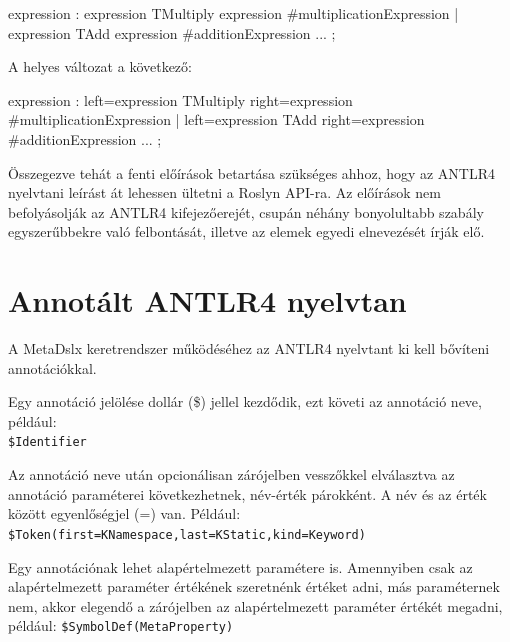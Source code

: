 \documentclass[12pt, a4paper]{report}
\newcommand{\f}[1]{\texttt{#1}}
\begin{document}
\begin{antlr4code}
expression
	: expression TMultiply expression #multiplicationExpression
	| expression TAdd expression #additionExpression
	...
	;
\end{antlr4code}

A helyes változat a következő:

\begin{antlr4code}
expression
	: left=expression TMultiply right=expression #multiplicationExpression
	| left=expression TAdd right=expression #additionExpression
	...
	;
\end{antlr4code}

%
%

Összegezve tehát a fenti előírások betartása szükséges ahhoz, hogy az ANTLR4 nyelvtani leírást át lehessen ültetni a Roslyn API-ra. Az előírások nem befolyásolják az ANTLR4 kifejezőerejét, csupán néhány bonyolultabb szabály egyszerűbbekre való felbontását, illetve az elemek egyedi elnevezését írják elő.


\section{Annotált ANTLR4 nyelvtan}

A MetaDslx keretrendszer működéséhez az ANTLR4 nyelvtant ki kell bővíteni annotációkkal.

Egy annotáció jelölése dollár (\$) jellel kezdődik, ezt követi az annotáció neve, például: \\ \f{\$Identifier}

Az annotáció neve után opcionálisan zárójelben vesszőkkel elválasztva az annotáció paraméterei következhetnek, név-érték párokként. A név és az érték között egyenlőségjel (=) van. Például: \f{\$Token(first=KNamespace,last=KStatic,kind=Keyword)}

Egy annotációnak lehet alapértelmezett paramétere is. Amennyiben csak az alapértelmezett paraméter értékének szeretnénk értéket adni, más paraméternek nem, akkor elegendő a zárójelben az alapértelmezett paraméter értékét megadni, például: \f{\$SymbolDef(MetaProperty)}
\end{document}
